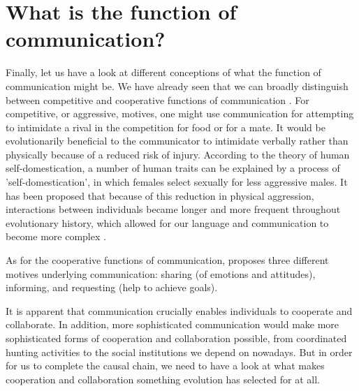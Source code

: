 \section{What is the function of communication?}
\label{sec:comm:function}

Finally, let us have a look at different conceptions of what the function of communication might be. We have already seen that we can broadly distinguish between competitive and cooperative functions of communication \citep{SeyfarthCheney03}.
For competitive, or aggressive, motives, one might use communication for attempting to intimidate a rival in the competition for food or for a mate. It would be evolutionarily beneficial to the communicator to intimidate verbally rather than physically because of a reduced risk of injury.
According to the theory of human self-domestication, a number of human traits can be explained by a process of 'self-domestication', in which females select sexually for less aggressive males. It has been proposed that because of this reduction in physical aggression, interactions between individuals became longer and more frequent throughout evolutionary history, which allowed for our language and communication to become more complex \citep{Benitez21}.

As for the cooperative functions of communication, \citet{Tomasello08-origins} proposes three different motives underlying communication: sharing (of emotions and attitudes), informing, and requesting (help to achieve goals).

It is apparent that communication crucially enables individuals to cooperate and collaborate. In addition, more sophisticated communication would make more sophisticated forms of cooperation and collaboration possible, from coordinated hunting activities to the social institutions we depend on nowadays.
But in order for us to complete the causal chain, we need to have a look at what makes cooperation and collaboration something evolution has selected for at all.

